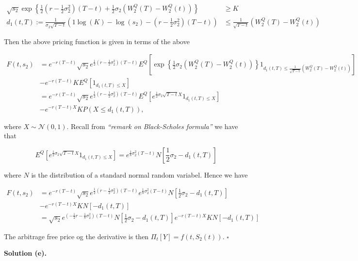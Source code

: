 \documentclass[
]{book}
\begin{document}
\begin{align*}
\sqrt{s_2}\exp\left\{\frac{1}{2}\left(r-\frac{1}{2}\sigma_2^2\right)(T-t)+\frac{1}{2}\sigma_2(W_2^Q(T)-W_2^Q(t))\right\}&\ge K\\
d_1(t,T):=\frac{1}{\sigma_2\sqrt{T-t}}\left(1\log(K)-\log(s_2)-\left(r-\frac{1}{2}\sigma_2^2\right)(T-t)\right)&\le \frac{1}{\sqrt{T-t}}\left(W_2^Q(T)-W_2^Q(t)\right)
\end{align*}

Then the above pricing function is given in terms of the above

\begin{align*}
F(t,s_2)&=e^{-r(T-t)}\sqrt{s_2}e^{\frac{1}{2}\left(r-\frac{1}{2}\sigma_2^2\right)(T-t)}E^Q\left[\exp\left\{\frac{1}{2}\sigma_2(W_2^Q(T)-W_2^Q(t))\right\}1_{d_1(t,T)\le \frac{1}{\sqrt{T-t}}\left(W_2^Q(T)-W_2^Q(t)\right)}\right]\\
&-e^{-r(T-t)}KE^Q\left[1_{d_1(t,T)\le X}\right]\\
&=e^{-r(T-t)}\sqrt{s_2}e^{\frac{1}{2}\left(r-\frac{1}{2}\sigma_2^2\right)(T-t)}E^Q\left[e^{\frac{1}{2}\sigma_2\sqrt{T-t}X}1_{d_1(t,T)\le X}\right]\\
&-e^{-r(T-t)X}KP\left(X\le d_1(t,T)\right),
\end{align*}

where \(X\sim\mathcal{N}(0,1)\). Recall from \emph{``remark on Black-Scholes formula''} we have that

\[
E^Q\left[e^{\frac{1}{2}\sigma_2\sqrt{T-t}X}1_{d_1(t,T)\le X}\right]=e^{\frac{1}{8}\sigma_2^2(T-t)}N\left[\frac{1}{2}\sigma_2-d_1(t,T)\right]
\]

where \(N\) is the distribution of a standard normal random variabel. Hence we have

\begin{align*}
F(t,s_2)&=e^{-r(T-t)}\sqrt{s_2}e^{\frac{1}{2}\left(r-\frac{1}{2}\sigma_2^2\right)(T-t)}e^{\frac{1}{8}\sigma_2^2(T-t)}N\left[\frac{1}{2}\sigma_2-d_1(t,T)\right]\\
&-e^{-r(T-t)X}KN\left[-d_1(t,T)\right]\\
&=\sqrt{s_2}e^{\left(-\frac{1}{2}r-\frac{1}{8}\sigma_2^2\right)(T-t)}N\left[\frac{1}{2}\sigma_2-d_1(t,T)\right]e^{-r(T-t)X}KN\left[-d_1(t,T)\right]
\end{align*}

The arbitrage free price og the derivative is then \(\Pi_t[Y]=f(t,S_2(t))\). \(\square\)

\noindent\makebox[\linewidth]{\rule{\textwidth}{0.4pt}}

\textbf{Solution (e).}
\end{document}

